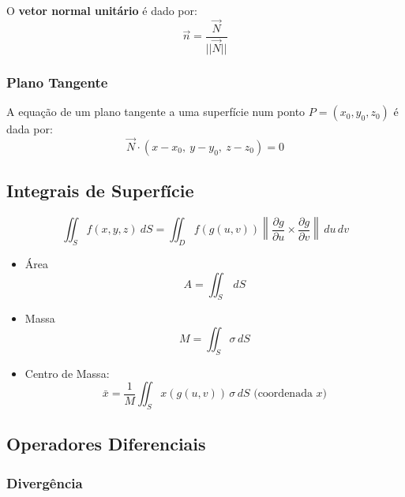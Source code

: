 \documentclass[11pt, a4paper]{article}
\begin{document}
O \textbf{vetor normal unitário} é dado por:
\begin{equation*}
    \vec{n} = \frac{\vec{N}}{||\vec{N}||}
\end{equation*}

\subsubsection{Plano Tangente}

A equação de um plano tangente a uma superfície num ponto $P = (x_0, y_0, z_0)$ é dada por:
\begin{equation*}
    \vec{N} \cdot \left(x - x_0,\ y - y_0,\ z - z_0\right) = 0
\end{equation*}

\subsection{Integrais de Superfície}

\begin{equation*}
    \iint_S f(x, y, z) \ dS = \iint_D f(g(u, v))
    \left\lVert
    \frac{\partial g}{\partial u} \times
    \frac{\partial g}{\partial v}
    \right\rVert \, du\,dv
\end{equation*}

\begin{itemize}
    \item Área
          \begin{equation*}
              A = \iint_S \, dS
          \end{equation*}
    \item Massa
          \begin{equation*}
              M = \iint_S \sigma \, dS
          \end{equation*}
    \item Centro de Massa:
          \begin{equation*}
              \bar{x} = \frac{1}{M} \iint_S x(g(u, v)) \, \sigma \, dS
              \text{ \ \ \ \ \  (coordenada $x$)}
          \end{equation*}
\end{itemize}

\subsection{Operadores Diferenciais}

\subsubsection{Divergência}
\end{document}
